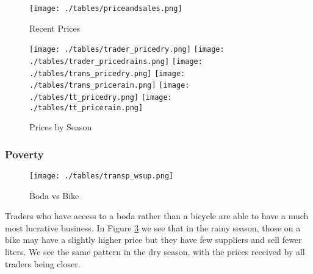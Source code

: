 \documentclass[11pt,letter,draft]{article}
\begin{document}
\begin{figure}[!th]
\centering
\caption{Recent Prices}
\label{fig:recentsales}
\texttt{[image: ./tables/priceandsales.png]}
\footnotesize{
\parbox{10cm}{\vspace{2mm}  \baselineskip=11pt}}%
\end{figure}

\begin{figure}[!th]
\centering
\caption{Prices by Season}
\label{fig:pricebysale}
\texttt{[image: ./tables/trader\_pricedry.png]}
\texttt{[image: ./tables/trader\_pricedrains.png]}
\texttt{[image: ./tables/trans\_pricedry.png]}
\texttt{[image: ./tables/trans\_pricerain.png]}
\texttt{[image: ./tables/tt\_pricedry.png]}
\texttt{[image: ./tables/tt\_pricerain.png]}
\footnotesize{
\parbox{10cm}{\vspace{2mm}  \baselineskip=11pt}}%
\end{figure}

\clearpage
\subsubsection{Poverty}

\begin{figure}[!th]
\centering
\caption{Boda vs Bike}
\label{fig:bodabike}
\texttt{[image: ./tables/transp\_wsup.png]}
\footnotesize{
\parbox{10cm}{\vspace{2mm}  \baselineskip=11pt}}%
\end{figure}

Traders who have access to a boda rather than a bicycle are able to have a much most lucrative business. In Figure \ref{fig:bodabike} we see that in the rainy season, those on a bike may have a slightly higher price but they have few suppliers and sell fewer liters. We see the same pattern in the dry season, with the prices received by all traders being closer. 
\end{document}
